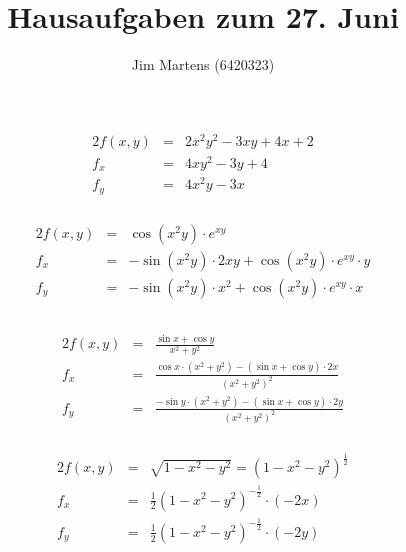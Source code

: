 \documentclass[10pt,a4paper,oneside,ngerman,numbers=noenddot]{scrartcl}
\begin{document}
\author{Jim Martens (6420323)}
\title{Hausaufgaben zum 27. Juni}
\maketitle
\section{} %
\subsubsection{} %
\begin{alignat*}{2}
f(x,y) &=& 2x^{2}y^{2} - 3xy + 4x + 2 \\
f_{x} &=& 4xy^{2} - 3y + 4 \\
f_{y} &=& 4x^{2}y - 3x
\end{alignat*}
\subsubsection{} %
\begin{alignat*}{2}
f(x,y) &=& \cos(x^{2}y) \cdot e^{xy} \\
f_{x} &=& -\sin(x^{2}y) \cdot 2xy + \cos(x^{2}y) \cdot e^{xy} \cdot y \\
f_{y} &=& -\sin(x^{2}y) \cdot x^{2} + \cos(x^{2}y) \cdot e^{xy} \cdot x \\
\end{alignat*}
\subsubsection{} %
\begin{alignat*}{2}
f(x,y) &=& \frac{\sin x + \cos y}{x^{2} + y^{2}} \\
f_{x} &=& \frac{\cos x \cdot (x^{2} + y^{2}) - (\sin x + \cos y) \cdot 2x}{(x^{2} + y^{2})^{2}} \\
f_{y} &=& \frac{-\sin y \cdot (x^{2} + y^{2}) - (\sin x + \cos y) \cdot 2y}{(x^{2} + y^{2})^{2}}
\end{alignat*}
\subsubsection{} %
\begin{alignat*}{2}
f(x,y) &=& \sqrt{1 - x^{2} - y^{2}} = (1 - x^{2} - y^{2})^{\frac{1}{2}} \\
f_{x} &=& \frac{1}{2}(1 - x^{2} - y^{2})^{-\frac{1}{2}} \cdot (-2x) \\
f_{y} &=& \frac{1}{2}(1 - x^{2} - y^{2})^{-\frac{1}{2}} \cdot (-2y)
\end{alignat*}
\end{document}
